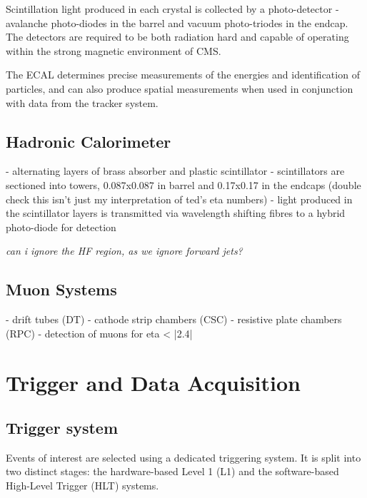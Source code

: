 Scintillation light produced in each crystal is collected by a photo-detector - 
avalanche photo-diodes in the barrel and vacuum photo-triodes in the endcap. The
detectors are required to be both radiation hard and capable of operating within
the strong magnetic environment of CMS.

The ECAL determines precise measurements of the energies and identification of
particles, and can also produce spatial measurements when used in conjunction 
with data from the tracker system.

\subsection{Hadronic Calorimeter}

- alternating layers of brass absorber and plastic scintillator
- scintillators are sectioned into towers, 0.087x0.087 in barrel and 0.17x0.17 
in the endcaps (double check this isn't just my interpretation of ted's eta 
numbers)
- light produced in the scintillator layers is transmitted via wavelength 
shifting fibres to a hybrid photo-diode for detection

\emph{can i ignore the HF region, as we ignore forward jets?}

\subsection{Muon Systems}

- drift tubes (DT)
- cathode strip chambers (CSC)
- resistive plate chambers (RPC)
- detection of muons for eta < |2.4|

\section{Trigger and Data Acquisition}  %
\label{sec:detector_trigger}

\subsection{Trigger system}
Events of interest are selected using a dedicated triggering system. It is 
split into two distinct stages: the hardware-based Level 1 (L1) and
the software-based High-Level Trigger (HLT) systems.

